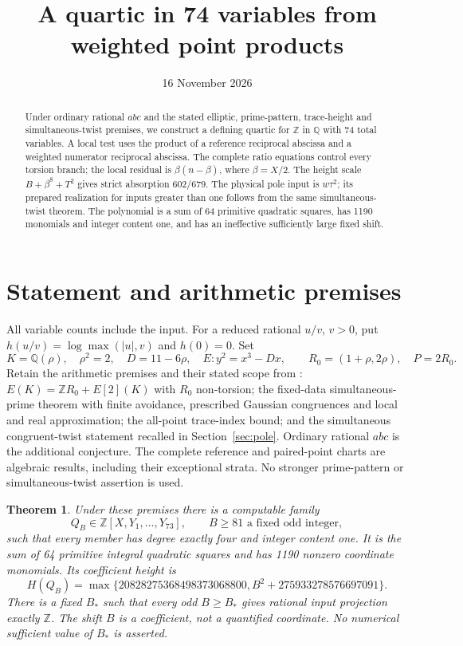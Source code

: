 \documentclass[11pt,a4paper]{article}
\title{A quartic in 74 variables from weighted point products}
\author{}\date{16 November 2026}
\newtheorem{theorem}{Theorem}[section]
\newcommand{\Q}{\mathbb Q}\newcommand{\Z}{\mathbb Z}
\begin{document}
\maketitle
\begin{abstract}
Under ordinary rational $abc$ and the stated elliptic, prime-pattern,
trace-height and simultaneous-twist premises, we construct a defining
quartic for $\Z$ in $\Q$ with 74 total variables. A local test uses the
product of a reference reciprocal abscissa and a weighted numerator
reciprocal abscissa. The complete ratio equations control every torsion
branch; the local residual is $\beta(n-\beta)$, where $\beta=X/2$.
The height scale $B+\beta^8+T^2$ gives strict absorption $602/679$.
The physical pole input is $w\tau^2$; its prepared realization for inputs
greater than one follows from the same simultaneous-twist theorem.
The polynomial is a sum of 64 primitive quadratic squares, has 1190
monomials and integer content one, and has an ineffective sufficiently
large fixed shift.
\end{abstract}

\section{Statement and arithmetic premises}
All variable counts include the input. For a reduced rational $u/v$,
$v>0$, put $h(u/v)=\log\max(|u|,v)$ and $h(0)=0$.
Set
\[
 K=\Q(\rho),\quad\rho^2=2,\quad D=11-6\rho,\quad
 E:y^2=x^3-Dx,\qquad R_0=(1+\rho,2\rho),\quad P=2R_0.
\]
Retain the arithmetic premises and their stated scope from
\cite{Parent}: $E(K)=\Z R_0+E[2](K)$ with $R_0$ non-torsion;
the fixed-data simultaneous-prime theorem with finite avoidance,
prescribed Gaussian congruences and local and real approximation;
the all-point trace-index bound; and the simultaneous congruent-twist
statement recalled in Section~\ref{sec:pole}. Ordinary rational $abc$
is the additional conjecture. The complete reference and paired-point
charts are algebraic results, including their exceptional strata.
No stronger prime-pattern or simultaneous-twist assertion is used.

\begin{theorem}\label{thm:main}
Under these premises there is a computable family
\[
 Q_B\in\Z[X,Y_1,\ldots,Y_{73}],\qquad
 B\ge81\text{ a fixed odd integer},
\]
such that every member has degree exactly four and integer content one.
It is the sum of 64 primitive integral quadratic squares and has
1190 nonzero coordinate monomials. Its coefficient height is
\[
 H(Q_B)=\max\{20828275368498373068800,
                  B^2+275933278576697091\}.
\]
There is a fixed $B_*$ such that every odd $B\ge B_*$ gives rational
input projection exactly $\Z$. The shift $B$ is a coefficient, not a
quantified coordinate. No numerical sufficient value of $B_*$ is asserted.
\end{theorem}
\end{document}
